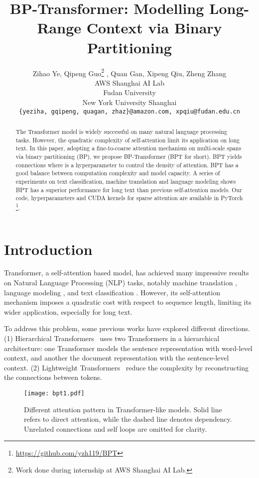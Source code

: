 \documentclass[11pt,a4paper]{article}
\title{BP-Transformer: Modelling Long-Range Context via Binary Partitioning}
\author{Zihao Ye\footnotemark[2] , Qipeng Guo\footnotemark[2] \hspace{0.5mm}\footnotemark[3] \hspace{0.5mm}\thanks{Work done during internship at AWS Shanghai AI Lab.} , Quan Gan\footnotemark[2] ,  Xipeng Qiu\footnotemark[3] \hspace{0.5mm}, Zheng Zhang\footnotemark[2] \hspace{0.5mm}\footnotemark[4] \\
\footnotemark[2]\hspace{0.5mm} AWS Shanghai AI Lab\\
\footnotemark[3]\hspace{0.5mm} Fudan University\\
\footnotemark[4]\hspace{0.5mm} New York University Shanghai \\
\texttt{\{yeziha, gqipeng, quagan, zhaz\}@amazon.com, xpqiu@fudan.edu.cn}
}
\date{}
\begin{document}
\maketitle

\begin{abstract}
The Transformer model is widely successful on many natural language processing tasks. However, the quadratic complexity of self-attention limit its application on long text.
In this paper, adopting a fine-to-coarse attention mechanism on multi-scale spans via binary partitioning (BP), we propose BP-Transformer (BPT for short). BPT yields  connections where  is a hyperparameter to control the density of attention. BPT has a good balance between computation complexity and model capacity. A series of experiments on text classification, machine translation and language modeling shows BPT has a superior performance for long text than previous self-attention models.
Our code, hyperparameters and CUDA kernels for sparse attention are available in PyTorch \footnote{\url{https://github.com/yzh119/BPT}}.
\end{abstract}

\section{Introduction}

Transformer, a self-attention based model, has achieved many impressive results on Natural Language Processing (NLP) tasks, notably machine translation \citep{vaswani2017attention}, language modeling \citep{radford2018improving}, and text classification \citep{devlin2018bert}.
However, its self-attention mechanism imposes a quadratic cost with respect to sequence length, limiting its wider application, especially for long text.

To address this problem, some previous works have explored different directions. (1) Hierarchical Transformers~\citep{miculicich-etal-2018-document,liu2019hierarchical} uses two Transformers in a hierarchical architecture: one Transformer models the sentence representation with word-level context, and another the document representation with the sentence-level context. (2) Lightweight Transformers~\citep{child2019sparsetransformer,sukhbaatar2019adaptive,guo2019startransformer,dai2019transformer} reduce the complexity by reconstructing the connections between tokens.



\begin{figure}
\centering
\texttt{[image: bpt1.pdf]}
\caption{Different attention pattern in Transformer-like models. Solid line refers to direct attention, while the dashed line denotes dependency. Unrelated connections and self loops are omitted for clarity.}
\label{fig:bpt1}
\end{figure}
\end{document}
